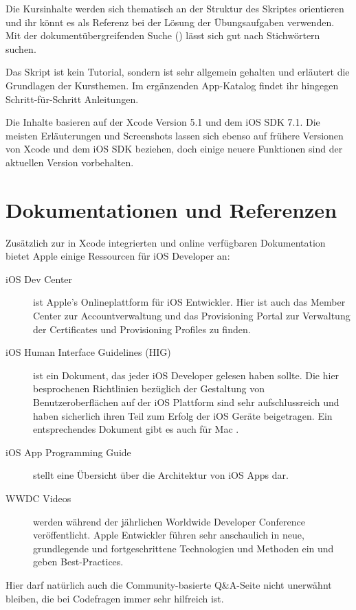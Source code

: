 \documentclass[parskip=half, final]{scrreprt}
\newcommand{\vxcode}{5.1}
\newcommand{\vios}{7.1}
\begin{document}
Die Kursinhalte werden sich thematisch an der Struktur des Skriptes orientieren und ihr könnt es als Referenz bei der Lösung der Übungsaufgaben verwenden. Mit der dokumentübergreifenden Suche () lässt sich gut nach Stichwörtern suchen.

Das Skript ist kein Tutorial, sondern ist sehr allgemein gehalten und erläutert die Grundlagen der Kursthemen. Im ergänzenden App-Katalog findet ihr hingegen Schritt-für-Schritt Anleitungen.

Die Inhalte basieren auf der Xcode Version \vxcode{} und dem iOS SDK \vios{}. Die meisten Erläuterungen und Screenshots lassen sich ebenso auf frühere Versionen von Xcode und dem iOS SDK beziehen, doch einige neuere Funktionen sind der aktuellen Version vorbehalten.

\section{Dokumentationen und Referenzen}\label{sec:docs}

Zusätzlich zur in Xcode integrierten und online verfügbaren Dokumentation  bietet Apple einige Ressourcen für iOS Developer an:

\begin{description}
\item[iOS Dev Center]  ist Apple's Onlineplattform für iOS Entwickler. Hier ist auch das Member Center zur Accountverwaltung und das Provisioning Portal zur Verwaltung der Certificates und Provisioning Profiles  zu finden.
\item[iOS Human Interface Guidelines (HIG)]  ist ein Dokument, das jeder iOS Developer gelesen haben sollte. Die hier besprochenen Richtlinien bezüglich der Gestaltung von Benutzeroberflächen auf der iOS Plattform sind sehr aufschlussreich und haben sicherlich ihren Teil zum Erfolg der iOS Geräte beigetragen. Ein entsprechendes Dokument gibt es auch für Mac .
\item[iOS App Programming Guide]  stellt eine Übersicht über die Architektur von iOS Apps dar.
\item[WWDC Videos]  werden während der jährlichen Worldwide Developer Conference veröffentlicht. Apple Entwickler führen sehr anschaulich in neue, grundlegende und fortgeschrittene Technologien und Methoden ein und geben Best-Practices.
\end{description}

Hier darf natürlich auch die Community-basierte Q\&A-Seite  nicht unerwähnt bleiben, die bei Codefragen immer sehr hilfreich ist.
\end{document}
